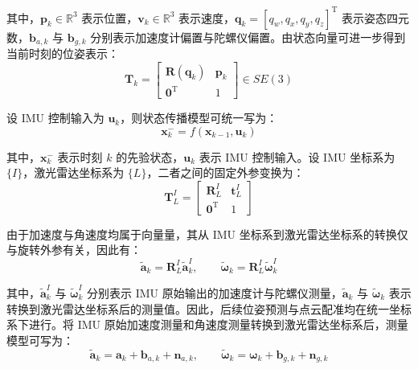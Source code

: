 其中，$\mathbf{p}_{k}\in \mathbb{R}^{3}$ 表示位置，$\mathbf{v}_{k}\in \mathbb{R}^{3}$ 表示速度，$\mathbf{q}_{k}=[q_{w},q_{x},q_{y},q_{z}]^{\mathrm{T}}$ 表示姿态四元数，$\mathbf{b}_{a,k}$ 与 $\mathbf{b}_{g,k}$ 分别表示加速度计偏置与陀螺仪偏置。由状态向量可进一步得到当前时刻的位姿表示：
\begin{equation}
\mathbf{T}_{k}=
\begin{bmatrix}
\mathbf{R}\left(\mathbf{q}_{k}\right) & \mathbf{p}_{k}\\
\mathbf{0}^{\mathrm{T}} & 1
\end{bmatrix}
\in SE(3)
\end{equation}

设 IMU 控制输入为 $\mathbf{u}_{k}$，则状态传播模型可统一写为：
\begin{equation}
\mathbf{x}_{k}^{-}
=
f\left(\mathbf{x}_{k-1},\mathbf{u}_{k}\right)
\end{equation}

其中，$\mathbf{x}_{k}^{-}$ 表示时刻 $k$ 的先验状态，$\mathbf{u}_{k}$ 表示 IMU 控制输入。设 IMU 坐标系为 $\{I\}$，激光雷达坐标系为 $\{L\}$，二者之间的固定外参变换为：
\begin{equation}
\mathbf{T}_{L}^{I}
=
\begin{bmatrix}
\mathbf{R}_{L}^{I} & \mathbf{t}_{L}^{I}\\
\mathbf{0}^{\mathrm{T}} & 1
\end{bmatrix}
\end{equation}

由于加速度与角速度均属于向量量，其从 IMU 坐标系到激光雷达坐标系的转换仅与旋转外参有关，因此有：
\begin{equation}
\tilde{\mathbf{a}}_{k}
=
\mathbf{R}_{L}^{I}\tilde{\mathbf{a}}_{k}^{I},
\qquad
\tilde{\boldsymbol{\omega}}_{k}
=
\mathbf{R}_{L}^{I}\tilde{\boldsymbol{\omega}}_{k}^{I}
\end{equation}

其中，$\tilde{\mathbf{a}}_{k}^{I}$ 与 $\tilde{\boldsymbol{\omega}}_{k}^{I}$ 分别表示 IMU 原始输出的加速度计与陀螺仪测量，$\tilde{\mathbf{a}}_{k}$ 与 $\tilde{\boldsymbol{\omega}}_{k}$ 表示转换到激光雷达坐标系后的测量值。因此，后续位姿预测与点云配准均在统一坐标系下进行。将 IMU 原始加速度测量和角速度测量转换到激光雷达坐标系后，测量模型可写为：
\begin{equation}
\tilde{\mathbf{a}}_{k}
=
\mathbf{a}_{k}
+\mathbf{b}_{a,k}
+\mathbf{n}_{a,k},
\qquad
\tilde{\boldsymbol{\omega}}_{k}
=
\boldsymbol{\omega}_{k}
+\mathbf{b}_{g,k}
+\mathbf{n}_{g,k}
\end{equation}

